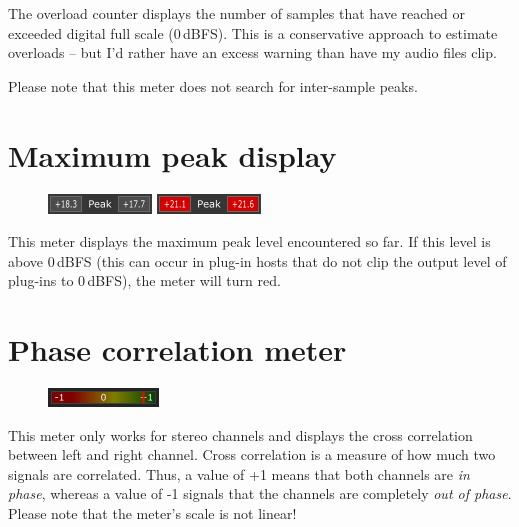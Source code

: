The overload counter displays the number of samples that have reached
or exceeded digital full scale (0\,dBFS).  This is a conservative
approach to estimate overloads -- but I'd rather have an excess
warning than have my audio files clip.

Please note that this meter does not search for inter-sample peaks.

\section{Maximum peak display}

\begin{figure}
  \includegraphics[scale=\screenshotscale,clip]{include/images/maximum_peak_normal.png}
  \newline \vspace{-0.9\baselineskip}
  \includegraphics[scale=\screenshotscale,clip]{include/images/maximum_peak_clipped.png}
\end{figure}

This meter displays the maximum peak level encountered so far.  If
this level is above 0\,dBFS (this can occur in plug-in hosts that do
not clip the output level of plug-ins to 0\,dBFS), the meter will turn
red.

\section{Phase correlation meter}

\begin{figure}
  \includegraphics[scale=\screenshotscale,clip]{include/images/phase_correlation_meter.png}
\end{figure}

This meter only works for stereo channels and displays the cross
correlation between left and right channel.  Cross correlation is a
measure of how much two signals are correlated.  Thus, a value of +1
means that both channels are \emph{in phase}, whereas a value of -1
signals that the channels are completely \emph{out of phase}.  Please
note that the meter's scale is not linear!

